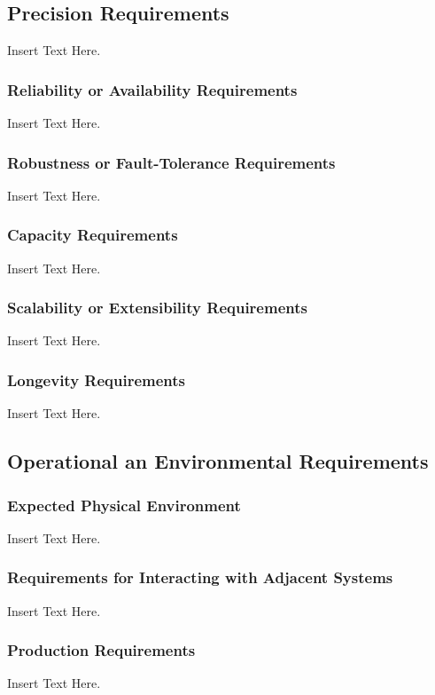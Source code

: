\documentclass [12pt]{article}
\begin{document}
\subsection{Precision Requirements}
		Insert Text Here.

\subsubsection{Reliability or Availability  Requirements}
		Insert Text Here.

\subsubsection{Robustness or Fault-Tolerance Requirements }

		Insert Text Here.
\subsubsection{Capacity Requirements }
		Insert Text Here.

\subsubsection{Scalability or Extensibility Requirements }
		Insert Text Here. 
		
\subsubsection{Longevity Requirements }
		Insert Text Here.

\subsection{Operational an Environmental Requirements}
\subsubsection{Expected Physical Environment }
		Insert Text Here.
		
\subsubsection{Requirements for Interacting with Adjacent Systems}
		Insert Text Here.

\subsubsection{Production Requirements}
		Insert Text Here. 
\end{document}
